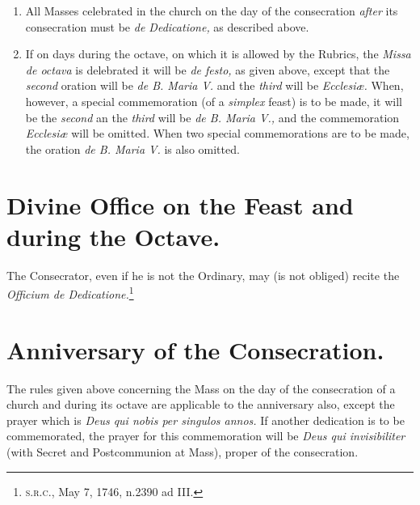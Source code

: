 \documentclass[letterpaper]{report}
\newcommand\src{\textsc{s.r.c.}}
\begin{document}
{\begin{enumerate}
    \item All Masses celebrated in the church on the day of the consecration
        \textit{after} its consecration must be \textit{de Dedicatione,} as
        described above.

    \item If on days during the octave, on which it is allowed by the Rubrics,
        the \textit{Missa de octava} is delebrated it will be \textit{de
        festo,} as given above, except that the \textit{second} oration will be
        \textit{de B. Maria V.} and the \textit{third} will be
        \textit{Ecclesi\ae.} When, however, a special commemoration (of a
        \textit{simplex} feast) is to be made, it will be the \textit{second}
        an the \textit{third} will be \textit{de B. Maria V.,} and the
        commemoration \textit{Ecclesi\ae} will be omitted. When two special
        commemorations are to be made, the oration \textit{de B. Maria V.} is
        also omitted.

\end{enumerate}

\section{Divine Office on the Feast and during the Octave.}

\rubric The Consecrator, even if he is not the Ordinary, may (is not obliged)
recite the \textit{Officium de Dedicatione.}\footnote{\src, May 7, 1746,
n.2390 ad III.}

\section{Anniversary of the Consecration.}

\rubric The rules given above concerning the Mass on the day of the
consecration of a church and during its octave are applicable to the
anniversary also, except the prayer which is \textit{Deus qui nobis per
singulos annos.} If another dedication is to be commemorated, the prayer for
this commemoration will be \textit{Deus qui invisibiliter} (with Secret and
Postcommunion at Mass), proper of the consecration.

}

\nocite{levav:churchconsecration}
\nocite{ml:1947}
\nocite{ml:1959}
\nocite{rc:ecclesiae}
\printbibliography
    
\end{document}
